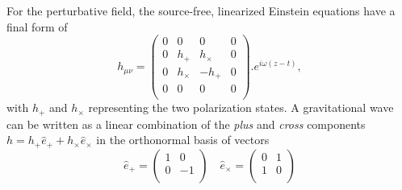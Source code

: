 For the perturbative field, the source-free, linearized Einstein equations have a final form of
\begin{equation}
    h_{\mu \nu} = 
    \begin{pmatrix}
         0 & 0 & 0 & 0\\
         0 & h_{+} & h_{\times} & 0\\
         0 & h_{\times} & -h_{+} & 0\\
         0 & 0 & 0 & 0\\
    \end{pmatrix}
    .e^{i\omega(z-t)},
\end{equation}
with $h_{+}$ and $h_{\times}$ representing the two polarization states. A gravitational wave can be written as a linear combination of the \textit{plus} and \textit{cross} components $h = h_{+}\hat{e}_{+} + h_{\times}\hat{e}_{\times}$ in the orthonormal basis of vectors
\begin{equation}
    \hat{e}_{+} = 
    \begin{pmatrix}
        1 & 0\\
        0 & -1\\
    \end{pmatrix} \quad
    \hat{e}_{\times} = 
    \begin{pmatrix}
        0 & 1\\
        1 & 0\\
    \end{pmatrix}
\end{equation}

